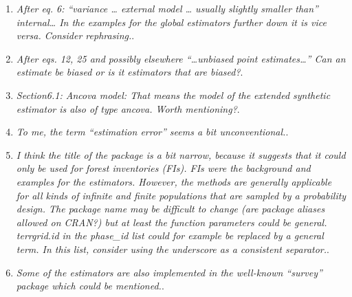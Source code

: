 \documentclass{article}
\begin{document}
\begin{enumerate}
\item \textit{After eq. 6: “variance … external model … usually slightly smaller than” internal… In the examples for the global estimators further down it is vice versa. Consider rephrasing.}.

\answerfin{}

\item \textit{After eqs. 12, 25 and possibly elsewhere “…unbiased point estimates…” Can an estimate be biased or is it estimators that are biased?}.


\item \textit{Section6.1: Ancova model: That means the model of the extended synthetic estimator is also of type ancova. Worth mentioning?}.

\answerfin{}

\item \textit{To me, the term “estimation error” seems a bit unconventional.}.

\answerfin{}

\item \textit{I think the title of the package is a bit narrow, because it suggests that it could only be used for forest inventories (FIs). FIs were the background and examples for the estimators. However, the methods are generally applicable for all kinds of infinite and finite populations that are sampled by a probability design. The package name may be difficult to change (are package aliases allowed on CRAN?) but at least the function parameters could be general. terrgrid.id in the phase\_id list could for example be replaced by a general term. In this list, consider using the underscore as a consistent separator.}.

\answerfin{}

\item \textit{Some of the estimators are also implemented in the well-known “survey” package which could be mentioned.}.


\end{enumerate}
\end{document}
